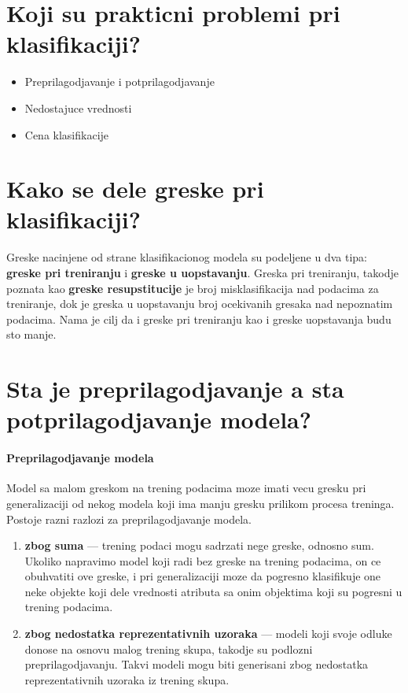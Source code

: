 \documentclass[a4paper]{article}
\begin{document}
\section{Koji su prakticni problemi pri klasifikaciji?}
\begin{itemize}
    \item Preprilagodjavanje i potprilagodjavanje
    \item Nedostajuce vrednosti
    \item Cena klasifikacije
\end{itemize}

\section{Kako se dele greske pri klasifikaciji?}
Greske nacinjene od strane klasifikacionog modela su podeljene u dva tipa: \textbf{greske pri
treniranju} i \textbf{greske u uopstavanju}. Greska pri treniranju, takodje poznata kao
\textbf{greske resupstitucije} je broj misklasifikacija nad podacima za treniranje, dok je greska u
uopstavanju broj ocekivanih gresaka nad nepoznatim podacima. Nama je cilj da i greske pri treniranju
kao i greske uopstavanja budu sto manje.

\section{Sta je preprilagodjavanje a sta potprilagodjavanje modela?}
\paragraph{Preprilagodjavanje modela} Model sa malom greskom na trening podacima moze imati vecu
gresku pri generalizaciji od nekog modela koji ima manju gresku prilikom procesa treninga. Postoje
razni razlozi za preprilagodjavanje modela.
\begin{enumerate}
    \item \textbf{zbog suma} --- trening podaci mogu sadrzati nege greske,
        odnosno sum.  Ukoliko napravimo model koji radi bez greske na trening podacima, on ce
        obuhvatiti ove greske, i pri generalizaciji moze da pogresno klasifikuje one neke objekte
        koji dele vrednosti atributa sa onim objektima koji su pogresni u trening podacima.
    \item \textbf{zbog nedostatka reprezentativnih uzoraka} --- modeli koji svoje odluke donose na
        osnovu malog trening skupa, takodje su podlozni preprilagodjavanju. Takvi modeli mogu biti
        generisani zbog nedostatka reprezentativnih uzoraka iz trening skupa.
\end{enumerate}
\end{document}
